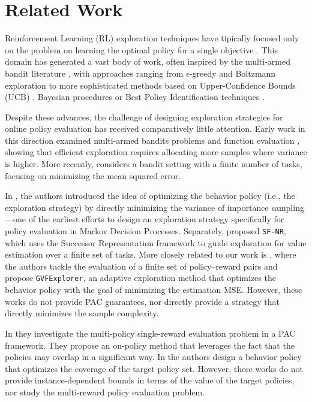 \section{Related Work}\label{sec:related_work}

 Reinforcement Learning (RL) exploration techniques have tipically focused only on the problem on learning the optimal policy for a single objective \cite{sutton2018reinforcement}. This domain has generated a vast body of work, often inspired by the multi-armed bandit literature \cite{lattimore2020bandit}, with approaches ranging from $\epsilon$-greedy and Boltzmann exploration \cite{watkins1989learning,sutton2018reinforcement} to more sophisticated methods based on Upper-Confidence Bounds (UCB) \cite{auer2002using}, Bayesian procedures \cite{osband2013more,russo2018tutorial} or Best Policy Identification techniques \cite{al2021navigating,wagenmaker2022beyond, taupin2023best}.

Despite these advances, the challenge of designing exploration strategies for  online policy evaluation has received comparatively little attention. Early work in this direction examined multi-armed bandits problems  \cite{antos2008active} and function evaluation \cite{carpentier2012adaptive}, showing that efficient exploration requires allocating more samples where variance is higher. More recently, \cite{linke2020adapting} considers a bandit setting with a finite number of tasks, focusing on minimizing the mean squared error.

 
In \cite{hanna2017data}, the authors introduced the idea of optimizing the behavior policy (i.e., the exploration strategy) by directly minimizing the variance of importance sampling—one of the earliest efforts to design an exploration strategy specifically for policy evaluation in Markov Decision Processes. Separately, \cite{mcleod2021continual} proposed \texttt{SF-NR}, which uses the Successor Representation framework \cite{dayan1993improving} to guide exploration for value estimation over a finite set of tasks. More closely related to our work is \cite{jain2024adaptive}, where the authors tackle the evaluation of a finite set of policy–reward pairs and propose \texttt{GVFExplorer}, an adaptive exploration method that optimizes the behavior policy with the goal of minimizing the estimation MSE. However, these works do not provide PAC guarantees, nor directly  provide a strategy that directly minimizes the sample complexity.

In \cite{dann2023reinforcement} they investigate  the multi-policy single-reward evaluation problem in a PAC framework. They propose an on-policy method that leverages the fact that the policies may overlap in a significant way. In \cite{chen2024multiple} the authors design a behavior policy that optimizes the coverage of the target policy set. However, these works do not provide instance-dependent   bounds in terms of the value of the target policies, nor study the multi-reward policy evaluation problem.